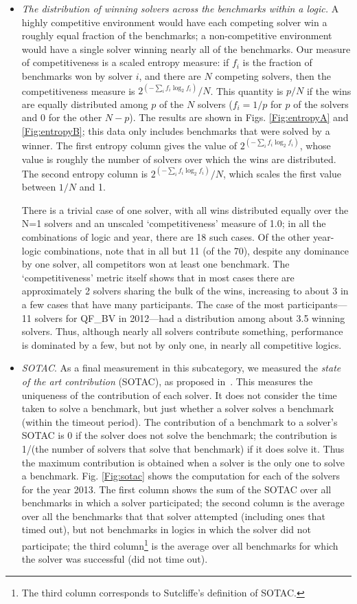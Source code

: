 \documentclass[smallcondensed]{svjour3}
\begin{document}
\begin{itemize}
\item {\em The distribution of winning solvers across the benchmarks within a logic.} A highly competitive environment would have each competing solver win a roughly equal fraction of the benchmarks; a non-competitive environment would have a single solver winning nearly all of the benchmarks. Our measure of competitiveness is a scaled entropy measure: if $f_i$ is the fraction of benchmarks won by solver $i$, and there are $N$ competing solvers, then the competitiveness measure is $ 2^{( - \sum_i f_i \log_2 f_i )} / N$. This quantity is $p/N$ if the wins are equally distributed among $p$ of the $N$ solvers ($f_i = 1/p$ for $p$ of the solvers and 0 for the other $N-p$). The results are shown in Figs. \ref{Fig:entropyA} and \ref{Fig:entropyB}; this data only includes benchmarks that were solved by a winner. The first entropy column gives the value of $ 2^{( - \sum_i f_i \log_2 f_i )}$, whose value is roughly the number of solvers over which the wins are distributed. The second entropy column is  $ 2^{( - \sum_i f_i \log_2 f_i )} / N$, which scales the first value between 
$1/N$ and 1.

There is a trivial case of one solver, with all wins distributed equally over the N=1 solvers and an unscaled `competitiveness' measure of 1.0; in all the combinations of logic and year, there are 18 such cases. Of the other year-logic combinations, note that in all but 11 (of the 70), despite any dominance by one solver, all competitors won at least one benchmark. The `competitiveness' metric itself shows that in most cases there are approximately 2 solvers sharing the bulk of the wins, increasing to about 3 in a few cases that have many participants. The case of the most participants---11 solvers for QF\_BV in 2012---had a distribution among about 3.5 winning solvers. Thus, although nearly all solvers contribute something, performance is dominated by a few, but not by only one, in nearly all competitive logics.

\item {\em SOTAC}. As a final measurement in this subcategory, we measured the {\em state of the art contribution} (SOTAC), as proposed  in~\cite{webCASC}. This measures the uniqueness of the contribution of each solver. It does not consider the time taken to solve a benchmark, but just whether a solver solves a benchmark (within the timeout period). The contribution of a benchmark to a solver's SOTAC is 0 if the solver does not solve the benchmark; the contribution is 1/(the number of solvers that solve that benchmark) if it does solve it. Thus the maximum contribution is obtained when a solver is the only one to solve a benchmark. Fig. \ref{Fig:sotac} shows the computation for each of the solvers for the year 2013. The first column shows the sum of the SOTAC over all benchmarks in which a solver participated;
the second column is the average over all the benchmarks that that solver attempted (including ones that timed out), but not benchmarks in logics in which the solver did not participate; the third column\footnote{The third column corresponds to Sutcliffe's definition of SOTAC.} is the average over all benchmarks for which the solver was successful (did not time out).


\end{itemize}
\end{document}
